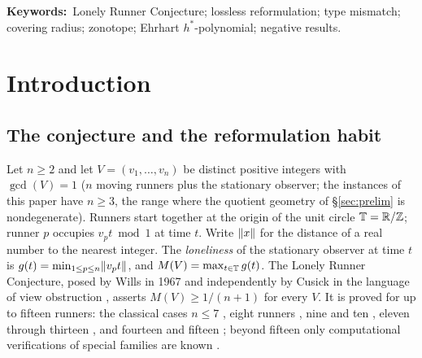 \begin{abstract}
$M(V)=\max_{\{u,w\}}\tau(u,w)$, the rigid-zone translate-class
classifications at $7,11,13,17,19,37$, and the composite-side structure
at $p^2$ and $pq$, with its hypothesis ledger---and a finite witness
archive with a certification ladder: exact deepest-hole classification at
$n=3$, away-certified and branch-and-bound certificates at $n=4$
($\rho=9/34$ at $v=(1,2,3,16)$), exact refutations at $n=5,6$ (the
sharpest two-sided), and certified deepest-hole equality at $n=5$,
$m=10,20,25,30$ ($\rho=\delta$ exactly). Every number is re-asserted by
a persisted, independent, exact computation, and the certification
method carries a negative control that correctly refuses a false
statement.
The paper is a negative-results paper and claims no progress on the
conjecture itself: it proves no new cases of $\lrc$, and the surviving
equivalent forms are as hard as they ever were. Its contribution is the
obstruction's anatomy---why four natural toolkits, each correct and each
productive on its own terms, cannot cross the same gap.
\end{abstract}

\noindent\textbf{Keywords:}\ Lonely Runner Conjecture; lossless
reformulation; type mismatch; covering radius; zonotope; Ehrhart
$h^*$-polynomial; negative results.

\section{Introduction}\label{sec:intro}

\subsection{The conjecture and the reformulation habit}

Let $n\ge 2$ and let $V=(v_1,\dots,v_n)$ be distinct positive integers
with $\gcd(V)=1$ ($n$ moving runners plus the stationary observer; the
instances of this paper have $n\ge 3$, the range where the quotient
geometry of \S\ref{sec:prelim} is nondegenerate). Runners start together
at the origin of the unit circle
$\mathbb{T}=\mathbb{R}/\mathbb{Z}$; runner $p$ occupies $v_p t \bmod 1$ at time $t$. Write
$\lVert x \rVert$ for the distance of a real number to the nearest integer. The
\emph{loneliness} of the stationary observer at time $t$ is
$g(t)=\min_{1\le p\le n}\lVert v_p t \rVert$, and $M(V)=\max_{t\in\mathbb{T}}g(t)$. The
Lonely Runner Conjecture, posed by Wills in 1967 and independently by
Cusick in the language of view obstruction
\cite{PS-survey,Wills,Cusick1973}, asserts $M(V)\ge 1/(n{+}1)$ for every
$V$. It is proved for up to fifteen runners: the classical cases
$n\le7$ \cite{PS-survey}, eight runners \cite{Rosenfeld8}, nine and ten
\cite{Trakulthongchai}, eleven through thirteen \cite{Sungkawichai}, and
fourteen and fifteen \cite{Allikvere}; beyond fifteen only computational
verifications of special families are known
\cite{PS-survey,MSS}.


